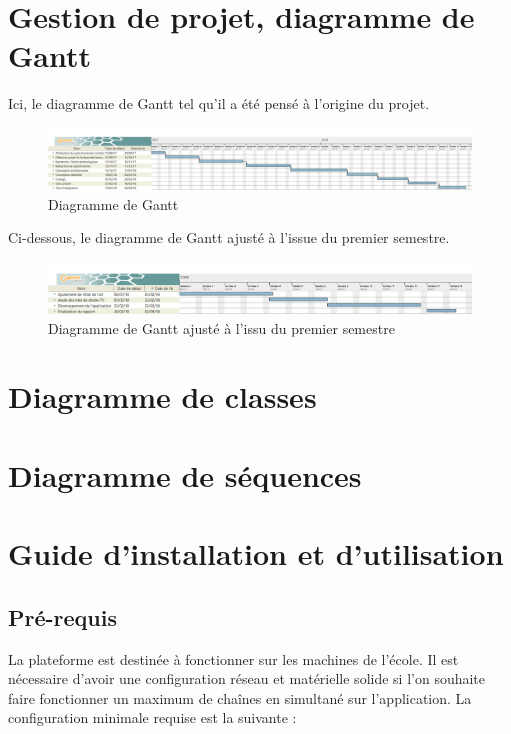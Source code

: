 \documentclass{polytech/polytech}
\begin{document}
\chapter{Gestion de projet, diagramme de Gantt}


Ici, le diagramme de Gantt tel qu'il a été pensé à l'origine du projet. 

\begin{figure}
	\includegraphics[scale=0.2]{images/Diagramme_PR&D}
	\caption{Diagramme de Gantt}
	\label{fig:gantt1}
\end{figure}


Ci-dessous, le diagramme de Gantt ajusté à l'issue du premier semestre.

\begin{figure}
	\includegraphics[scale=0.25]{images/Diagramme_PR&D2}
	\caption{Diagramme de Gantt ajusté à l'issu du premier semestre}
	\label{fig:gantt2}
\end{figure}


\chapter{Diagramme de classes}


\chapter{Diagramme de séquences}


\chapter{Guide d'installation et d'utilisation}


\section{Pré-requis}


La plateforme est destinée à fonctionner sur les machines de l’école. Il est nécessaire d'avoir une configuration réseau et matérielle solide si l'on souhaite faire fonctionner un maximum de chaînes en simultané sur l'application. La configuration minimale requise est la suivante :
\end{document}
